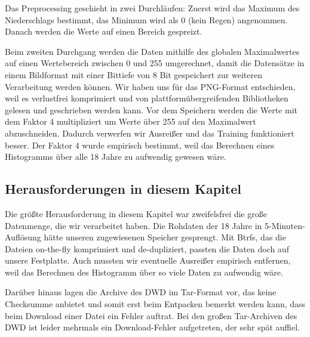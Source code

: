 Das Preprocessing geschieht in zwei Durchläufen: Zuerst wird das Maximum des Niederschlags bestimmt, das Minimum wird als 0 (kein Regen) angenommen. Danach werden die Werte auf einen Bereich gespreizt.

Beim zweiten Durchgang werden die Daten mithilfe des globalen Maximalwertes auf einen Wertebereich zwischen 0 und 255 umgerechnet, damit die Datensätze in einem Bildformat mit einer Bittiefe von 8 Bit gespeichert zur weiteren Verarbeitung werden können. Wir haben uns für das PNG-Format entschieden, weil es verlustfrei komprimiert und von platt­form­über­grei­fenden Bibliotheken gelesen und geschrieben werden kann.
Vor dem Speichern werden die Werte mit dem Faktor 4 multipliziert um Werte über 255 auf den Maximalwert abzuschneiden. Dadurch verwerfen wir Ausreißer und das Training funktioniert besser. Der Faktor 4 wurde empirisch bestimmt, weil das Berechnen eines Histogramms über alle 18 Jahre zu aufwendig gewesen wäre.

\subsection{Herausforderungen in diesem Kapitel}
Die größte Herausforderung in diesem Kapitel war zweifelsfrei die große Datenmenge, die wir verarbeitet haben. Die Rohdaten der 18 Jahre in 5-Minuten-Auflösung hätte unseren zugewiesenen Speicher gesprengt. Mit Btrfs, das die Dateien on-the-fly komprimiert und de-dupliziert, passten die Daten doch auf unsere Festplatte. Auch mussten wir eventuelle Ausreißer empirisch entfernen, weil das Berechnen des Histogramm über so viele Daten zu aufwendig wäre.

Darüber hinaus lagen die Archive des DWD im Tar-Format vor, das keine Checksumme anbietet und somit erst beim Entpacken bemerkt werden kann, dass beim Download einer Datei ein Fehler auftrat. Bei den großen Tar-Archiven des DWD ist leider mehrmals ein Download-Fehler aufgetreten, der sehr spät auffiel.
